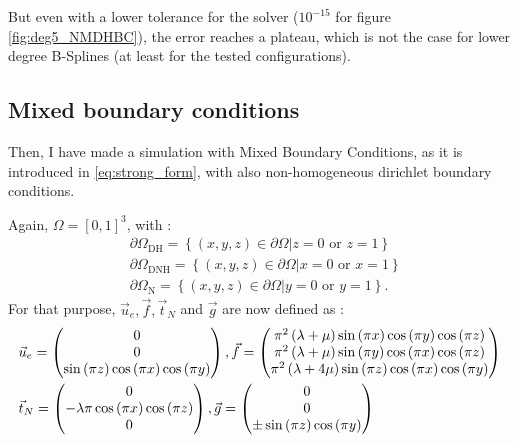 \documentclass[a4paper,12pt,twoside]{report}
\begin{document}
But even with a lower tolerance for the solver ($10^{-15}$ for figure \ref{fig:deg5_NMDHBC}), the error reaches a plateau, which is not the case for lower degree B-Splines (at least for the tested configurations).

\subsection{Mixed boundary conditions}

Then, I have made a simulation with Mixed Boundary Conditions, as it is introduced in \eqref{eq:strong_form}, with also non-homogeneous dirichlet boundary conditions.

Again, $\Omega = [0,1]^3$, with : 
\begin{equation*}
	\begin{aligned}
		& \partial \Omega_{\text{DH}} = \left\{  (x,y,z) \in \partial\Omega \left| z = 0 \text{ or } z = 1 \right.  \right\} \\ 
		& \partial \Omega_{\text{DNH}} = \left\{  (x,y,z) \in \partial\Omega \left| x = 0 \text{ or } x = 1 \right.  \right\} \\
		& \partial \Omega_{\text{N}} = \left\{  (x,y,z) \in \partial\Omega \left| y = 0 \text{ or } y = 1 \right.  \right\}.
	\end{aligned}
\end{equation*}
For that purpose, $\vec u_e, \vec f, \vec t_N$ and $\vec g$ are now defined as : 
\begin{equation*}
\begin{aligned}
	& \vec u_e =
	\begin{pmatrix}
		0 \\  
		0 \\ 
		\sin{\left(\pi z \right)} \cos{\left(\pi x \right)} \cos{\left(\pi y \right)}
	\end{pmatrix}, \hfill \vec f =  \begin{pmatrix}
	\pi^{2} \left(\lambda + \mu\right) \sin{\left(\pi x \right)} \cos{\left(\pi y \right)} \cos{\left(\pi z \right)} \\
	\pi^{2} \left(\lambda + \mu\right) \sin{\left(\pi y \right)} \cos{\left(\pi x \right)} \cos{\left(\pi z \right)} \\
	\pi^{2} \left(\lambda + 4 \mu\right) \sin{\left(\pi z \right)} \cos{\left(\pi x \right)} \cos{\left(\pi y \right)}
	\end{pmatrix} \\
	& \vec t_N = \begin{pmatrix}
	0 \\  
	- \lambda \pi \cos{\left(\pi x \right)} \cos{\left(\pi z \right)} \\  
	0
	\end{pmatrix}, \hfill \vec g = \begin{pmatrix}
	0 \\  
	0 \\ 
	\pm \sin{\left(\pi z \right)} \cos{\left(\pi y \right)}
	\end{pmatrix}
\end{aligned}
\end{equation*}	
\end{document}
